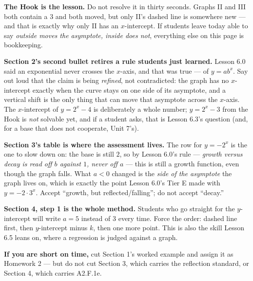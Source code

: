 \documentclass[10pt]{article}
\begin{document}
\begin{teachernote}
\textbf{The Hook is the lesson.} Do not resolve it in thirty seconds. Graphs II and III both contain a
$3$ and both moved, but only II's dashed line is somewhere new --- and that is exactly why only II has
an $x$-intercept. If students leave today able to say \emph{outside moves the asymptote, inside does
not}, everything else on this page is bookkeeping.

\textbf{Section 2's second bullet retires a rule students just learned.} Lesson 6.0 said an exponential
never crosses the $x$-axis, and that was true --- of $y=ab^{x}$. Say out loud that the claim is being
\emph{refined}, not contradicted: the graph has no $x$-intercept exactly when the curve stays on one
side of its asymptote, and a vertical shift is the only thing that can move that asymptote across the
$x$-axis. The $x$-intercept of $y=2^{x}-4$ is deliberately a whole number; $y=2^{x}-3$ from the Hook is
\emph{not} solvable yet, and if a student asks, that is Lesson 6.3's question (and, for a base that does
not cooperate, Unit 7's).

\textbf{Section 3's table is where the assessment lives.} The row for $y=-2^{x}$ is the one to slow down
on: the base is still $2$, so by Lesson 6.0's rule --- \emph{growth versus decay is read off $b$ against
$1$, never off $a$} --- this is still a growth function, even though the graph falls. What $a<0$ changed
is the \emph{side of the asymptote} the graph lives on, which is exactly the point Lesson 6.0's Tier E
made with $y=-2\cdot3^{x}$. Accept ``growth, but reflected/falling''; do not accept ``decay.''

\textbf{Section 4, step 1 is the whole method.} Students who go straight for the $y$-intercept will write
$a=5$ instead of $3$ every time. Force the order: dashed line first, then $y$-intercept minus $k$, then
one more point. This is also the skill Lesson 6.5 leans on, where a regression is judged against a graph.

\textbf{If you are short on time,} cut Section 1's worked example and assign it as Homework 2 --- but do
not cut Section 3, which carries the reflection standard, or Section 4, which carries A2.F.1e.
\end{teachernote}
\end{document}
